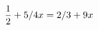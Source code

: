\documentclass[preview]{standalone}
\begin{document}
\begin{align*}
\special{dvisvgm:raw <g id='unique000'>}\frac{1}{2} + 5/4x = 2/3 + 9x\special{dvisvgm:raw </g>}
\end{align*}
\end{document}
